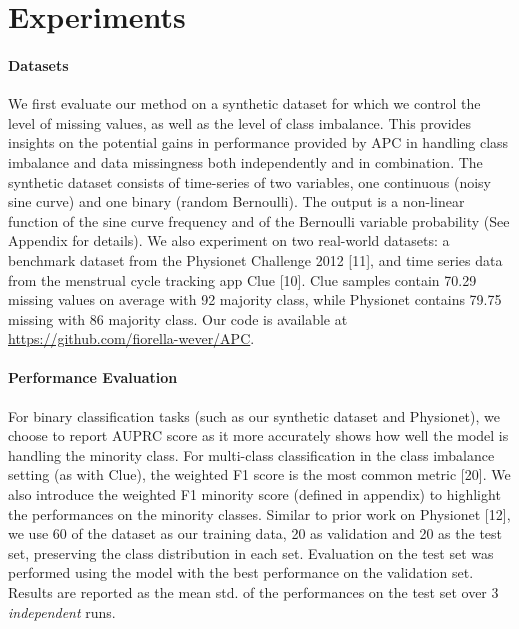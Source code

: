 \documentclass{article}
\begin{document}
\section{Experiments}


\paragraph{Datasets} We first evaluate our method on a synthetic dataset for which we control the level of missing values, as well as the level of class imbalance. This provides insights on the potential gains in performance provided by APC in handling class imbalance and data missingness both independently and in combination. The synthetic dataset consists of time-series of two variables, one continuous (noisy sine curve) and one binary (random Bernoulli). The output is a non-linear function of the sine curve frequency and of the Bernoulli variable probability (See Appendix for details).
We also experiment on two real-world datasets: a benchmark dataset from the Physionet Challenge 2012 [11], and time series data from the menstrual cycle tracking app Clue [10]. 
Clue samples contain 70.29 missing values on average with 92 majority class, while Physionet contains 79.75 missing with 86 majority class. 
Our code is available at \url{https://github.com/fiorella-wever/APC}.




\paragraph{Performance Evaluation}
For binary classification tasks (such as our synthetic dataset and Physionet), we choose to report AUPRC score as it more accurately shows how well the model is handling the minority class. 
For multi-class classification in the class imbalance setting (as with Clue), the weighted F1 score 
is the most common metric [20].
We also introduce the weighted F1 minority score (defined in appendix) to highlight the performances on the minority classes. 
Similar to prior work on Physionet [12], we use 60  of the dataset as our training data, 20  as validation and 20  as the test set, preserving the class distribution in each set.
Evaluation on the test set was performed using the model with the best performance on the validation set.
Results are reported as the mean  std. of the performances on the test set over 3 \textit{independent} runs.
\end{document}
